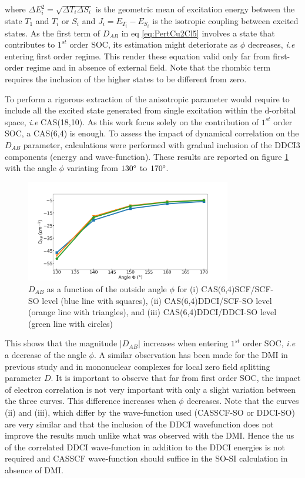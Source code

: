 \documentclass[10pt]{report}
\numberwithin{equation}{section}
\begin{document}
where $\Delta E^2_i=\sqrt{\Delta T_i \Delta S_i}$ is the geometric mean of excitation energy between the state $T_1$ and $T_i$ or $S_i$ and $J_i=E_{T_i}-E_{S_i}$ is the isotropic coupling between excited states.
As the first term of $D_{AB}$ in eq \ref{eq:PertCu2Cl5} involves a state that contributes to $1^{st}$ order SOC, its estimation might deteriorate as $\phi$ decreases, \textit{i.e} entering first order regime.
This render these equation valid only far from first-order regime and in absence of external field. Note that the rhombic term requires the inclusion of the higher states to be different from zero.

To perform a rigorous extraction of the anisotropic parameter would require to include all the excited state generated from single excitation within the d-orbital space, \textit{i.e} CAS(18,10).
As this work focus solely on the contribution of $1^{st}$ order SOC, a CAS(6,4) is enough. 
To assess the impact of dynamical correlation on the $D_{AB}$ parameter, calculations were performed with gradual inclusion of the DDCI3 components (energy and wave-function).
These results are reported on figure \ref{DABangle} with the angle $\phi$ variating from $130\degree$ to $170\degree$.

\begin{figure}[h!]
    \centering
    \includegraphics[width=0.8\textwidth]{Images/D_AB_Angle2.png}
    \caption{$D_{AB}$ as a function of the outside angle $\phi$ for (i) CAS(6,4)SCF/SCF-SO level (blue line with squares), (ii) CAS(6,4)DDCI/SCF-SO level (orange line with triangles), and (iii) CAS(6,4)DDCI/DDCI-SO level (green line with circles) }
    \label{DABangle}
\end{figure}

This shows that the magnitude $|D_{AB}|$ increases when entering $1^{st}$ order SOC, \textit{i.e} a decrease of the angle $\phi$.
A similar observation has been made for the DMI in previous study and in mononuclear complexes for local zero field splitting parameter $D$.
It is important to observe that far from first order SOC, the impact of electron correlation is not very important with only a slight variation between the three curves.
This difference increases when $\phi$ decreases.
Note that the curves (ii) and (iii), which differ by the wave-function used (CASSCF-SO or DDCI-SO) are very similar and that the inclusion of the DDCI wavefunction does not improve the results much unlike what was observed with the DMI.
Hence the us of the correlated DDCI wave-function in addition to the DDCI energies is not required and CASSCF wave-function should suffice in the SO-SI calculation in absence of DMI. 
\end{document}
